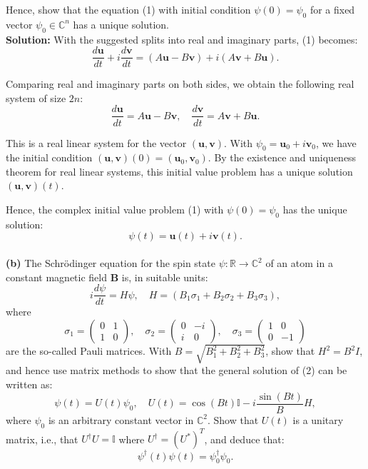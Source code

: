 \documentclass[10pt,landscape]{article}
\begin{document}
\begin{multicols}{2}
Hence, show that the equation (1) with initial condition \(\psi(0) = \psi_0\) for a fixed vector \(\psi_0 \in \mathbb{C}^n\) has a unique solution.\\

\textbf{Solution:} With the suggested splits into real and imaginary parts, (1) becomes:\\
\[
\frac{d\mathbf{u}}{dt} + i \frac{d\mathbf{v}}{dt} = (A\mathbf{u} - B\mathbf{v}) + i(A\mathbf{v} + B\mathbf{u}).
\]


Comparing real and imaginary parts on both sides, we obtain the following real system of size \(2n\):\\
\[
\frac{d\mathbf{u}}{dt} = A\mathbf{u} - B\mathbf{v}, \quad
\frac{d\mathbf{v}}{dt} = A\mathbf{v} + B\mathbf{u}.
\]


This is a real linear system for the vector \((\mathbf{u}, \mathbf{v})\). With \(\psi_0 = \mathbf{u}_0 + i\mathbf{v}_0\), we have the initial condition \((\mathbf{u}, \mathbf{v})(0) = (\mathbf{u}_0, \mathbf{v}_0)\). By the existence and uniqueness theorem for real linear systems, this initial value problem has a unique solution \((\mathbf{u}, \mathbf{v})(t)\). 

Hence, the complex initial value problem (1) with \(\psi(0) = \psi_0\) has the unique solution:
\[
\psi(t) = \mathbf{u}(t) + i\mathbf{v}(t).
\]
\\
\bigskip
\textbf{(b)}  The Schrödinger equation for the spin state \(\psi : \mathbb{R} \to \mathbb{C}^2\) of an atom in a constant magnetic field \(\mathbf{B}\) is, in suitable units:\\
\[
i \frac{d\psi}{dt} = H\psi, \quad H = (B_1\sigma_1 + B_2\sigma_2 + B_3\sigma_3), \tag{2}
\]
where
\[
\sigma_1 =
\begin{pmatrix}
0 & 1 \\
1 & 0
\end{pmatrix}, \quad
\sigma_2 =
\begin{pmatrix}
0 & -i \\
i & 0
\end{pmatrix}, \quad
\sigma_3 =
\begin{pmatrix}
1 & 0 \\
0 & -1
\end{pmatrix}
\]
are the so-called Pauli matrices. With \(B = \sqrt{B_1^2 + B_2^2 + B_3^2}\), show that \(H^2 = B^2I\), and hence use matrix methods to show that the general solution of (2) can be written as:\\
\[
\psi(t) = U(t)\psi_0, \quad U(t) = \cos(Bt)\mathbb{I} - i \frac{\sin(Bt)}{B} H, \tag{3}
\]
where \(\psi_0\) is an arbitrary constant vector in \(\mathbb{C}^2\). Show that \(U(t)\) is a unitary matrix, i.e., that \(U^\dagger U = \mathbb{I}\) where \(U^\dagger = (U^*)^T\), and deduce that:\\
\[
\psi^\dagger(t)\psi(t) = \psi^\dagger_0\psi_0.
\]



\end{multicols}
\end{document}
